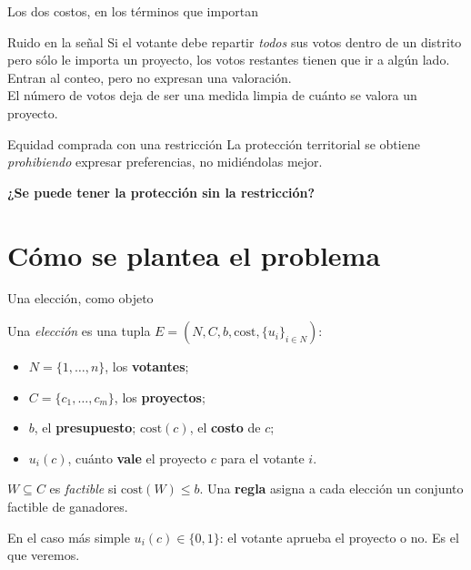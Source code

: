 \documentclass[11pt, aspectratio=169]{beamer}
\newcommand{\voters}{N}                 %
\newcommand{\projects}{C}               %
\newcommand{\budget}{b}                 %
\newcommand{\cost}{\mathrm{cost}}       %
\newcommand{\util}{u}                   %
\begin{document}
\begin{frame}{Los dos costos, en los términos que importan}
  \begin{block}{Ruido en la señal}
    Si el votante debe repartir \emph{todos} sus votos dentro de un distrito
    pero sólo le importa un proyecto, los votos restantes tienen que ir a algún
    lado. Entran al conteo, pero no expresan una valoración. \\[0.3em]
    El número de votos deja de ser una medida limpia de cuánto se valora un
    proyecto.
  \end{block}

  \begin{block}{Equidad comprada con una restricción}
    La protección territorial se obtiene \emph{prohibiendo} expresar
    preferencias, no midiéndolas mejor.
  \end{block}

  \centering\textbf{¿Se puede tener la protección sin la restricción?}
\end{frame}

\section{Cómo se plantea el problema}

\begin{frame}{Una elección, como objeto}
  \begin{definition}[Elección]
    Una \emph{elección} es una tupla
    $E=(\voters,\projects,\budget,\cost,\{\util_i\}_{i\in \voters})$:
    \begin{itemize}
      \item $\voters=\{1,\dots,n\}$, los \textbf{votantes};
      \item $\projects=\{c_1,\dots,c_m\}$, los \textbf{proyectos};
      \item $\budget$, el \textbf{presupuesto}; \quad $\cost(c)$, el
        \textbf{costo} de $c$;
      \item $\util_i(c)$, cuánto \textbf{vale} el proyecto $c$ para el votante $i$.
    \end{itemize}
  \end{definition}

  \vspace{0.3em}
  $W\subseteq\projects$ es \emph{factible} si $\cost(W)\leq\budget$. Una
  \textbf{regla} asigna a cada elección un conjunto factible de ganadores.

  \vspace{0.3em}
  {\small En el caso más simple $\util_i(c)\in\{0,1\}$: el votante aprueba el
  proyecto o no. Es el que veremos.}
\end{frame}
\end{document}
